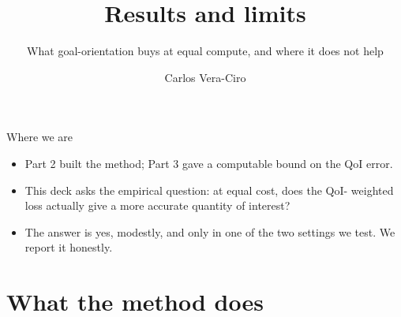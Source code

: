 \documentclass[11pt,aspectratio=169]{beamer}
\title{Results and limits}
\subtitle{What goal-orientation buys at equal compute, and where it does not help}
\author{Carlos Vera-Ciro}
\institute{Goal-Oriented DFR series \textbar\ Part 4}
\date{}
\begin{document}
\begin{frame}
  \titlepage
\end{frame}

\begin{frame}{Where we are}
  \begin{itemize}\itemsep0.6em
    \item Part 2 built the method; Part 3 gave a computable bound on the QoI
          error.
    \item This deck asks the empirical question: at equal cost, does the QoI-
          weighted loss actually give a more accurate quantity of interest?
    \item The answer is yes, modestly, and only in one of the two settings we
          test. We report it honestly.
  \end{itemize}
\end{frame}

\section{What the method does}
\end{document}
